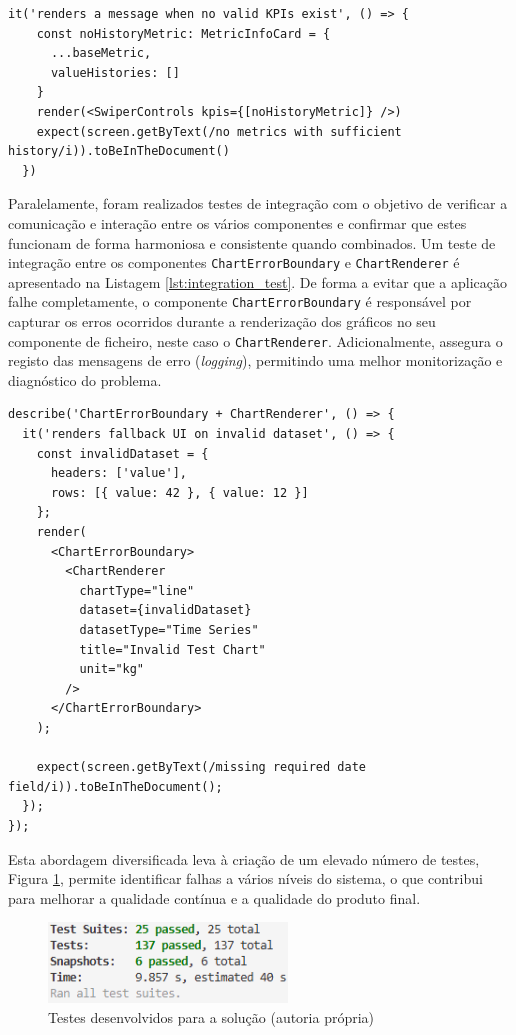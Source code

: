 \begin{lstlisting}[style=customts, caption={Teste unitáro ao componente \texttt{SwiperControls}}, label={lst:unit_test}]
it('renders a message when no valid KPIs exist', () => {
    const noHistoryMetric: MetricInfoCard = {
      ...baseMetric,
      valueHistories: []
    }
    render(<SwiperControls kpis={[noHistoryMetric]} />)
    expect(screen.getByText(/no metrics with sufficient history/i)).toBeInTheDocument()
  })
\end{lstlisting}

Paralelamente, foram realizados testes de integração com o objetivo de verificar a comunicação e interação entre os vários componentes e confirmar que estes funcionam de forma harmoniosa e consistente quando combinados. Um teste de integração entre os componentes \texttt{ChartErrorBoundary} e \texttt{ChartRenderer} é apresentado na Listagem \ref{lst:integration_test}. De forma a evitar que a aplicação falhe completamente, o componente \texttt{ChartErrorBoundary} é responsável por capturar os erros ocorridos durante a renderização dos gráficos no seu componente de ficheiro, neste caso o \texttt{ChartRenderer}. Adicionalmente, assegura o registo das mensagens de erro (\textit{logging}), permitindo uma melhor monitorização e diagnóstico do problema.

\begin{lstlisting}[style=customts, caption={Teste de integração entre \texttt{ChartErrorBoundary} e \texttt{ChartRenderer}}, label={lst:integration_test}]
describe('ChartErrorBoundary + ChartRenderer', () => {
  it('renders fallback UI on invalid dataset', () => {
    const invalidDataset = {
      headers: ['value'],
      rows: [{ value: 42 }, { value: 12 }]
    };
    render(
      <ChartErrorBoundary>
        <ChartRenderer
          chartType="line"
          dataset={invalidDataset}
          datasetType="Time Series"
          title="Invalid Test Chart"
          unit="kg"
        />
      </ChartErrorBoundary>
    );

    expect(screen.getByText(/missing required date field/i)).toBeInTheDocument();
  });
});
\end{lstlisting}


Esta abordagem diversificada leva à criação de um elevado número de testes, Figura \ref{fig:test_number}, permite identificar falhas a vários níveis do sistema, o que contribui para melhorar a qualidade contínua e a qualidade do produto final.

\begin{figure}[H]
    \centering
    \includegraphics[width=2.5in,keepaspectratio]{frontmatter/assets/tests/test_suits.png}
    \caption{Testes desenvolvidos para a solução (autoria própria)}
    \label{fig:test_number}
\end{figure}

